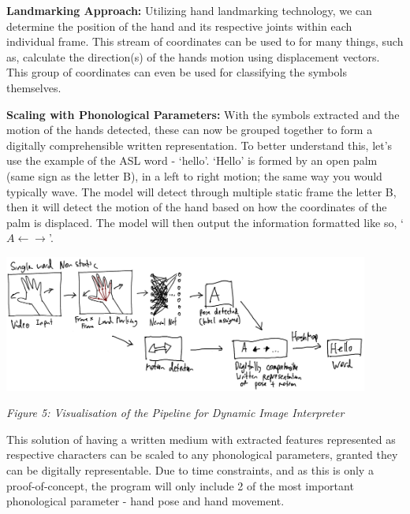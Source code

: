 \documentclass[11pt]{article}
\def\paraskip{\vskip 0.4cm}
\begin{document}
        \noindent\textbf{Landmarking Approach: } Utilizing hand landmarking technology, we can determine the position of the hand and its respective joints within each individual frame. This stream of coordinates can be used to for many things, such as, calculate the direction(s) of the hands motion using displacement vectors. This group of coordinates can even be used for classifying the symbols themselves.

        \paraskip

        \noindent\textbf{Scaling with Phonological Parameters: } With the symbols extracted and the motion of the hands detected, these can now be grouped together to form a digitally comprehensible written representation. To better understand this, let's use the example of the ASL word - `hello'. `Hello' is formed by an open palm (same sign as the letter B), in a left to right motion; the same way you would typically wave. The model will detect through multiple static frame the letter B, then it will detect the motion of the hand based on how the coordinates of the palm is displaced. The model will then output the information formatted like so, `$A \leftarrow \rightarrow$'.

        \begin{center}
            \includegraphics[width=12cm]{images/nonstaticModel.png}
            \\
            \raggedright \textit{
            Figure 5: Visualisation of the Pipeline for Dynamic Image Interpreter
            }
        \end{center}
        
        This solution of having a written medium with extracted features represented as respective characters can be scaled to any phonological parameters, granted they can be digitally representable. Due to time constraints, and as this is only a proof-of-concept, the program will only include 2 of the most important phonological parameter - hand pose and hand movement.

        \paraskip
\end{document}
